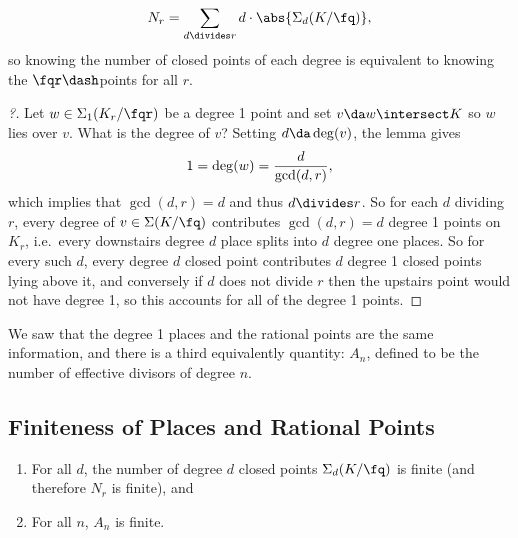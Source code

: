 \begin{corollary}

\begin{align*}  
N_r = \sum_{d\divides r} d\cdot \abs{\Sigma_d(K/ \fq)}
,\end{align*} so knowing the number of closed points of each degree is
equivalent to knowing the \(\fqr\dash\)points for all \(r\).

\end{corollary}

\begin{proof}[?]

Let \(w\in \Sigma_1(K_r/\fqr)\) be a degree 1 point and set
\(v \da w\intersect K\) so \(w\) lies over \(v\). What is the degree of
\(v\)? Setting \(d \da \deg(v)\), the lemma gives
\begin{align*}  
1 = \deg(w) = {d\over \gcd(d, r)}
,\end{align*} which implies that \(\gcd(d, r) = d\) and thus
\(d\divides r\). So for each \(d\) dividing \(r\), every degree of
\(v\in \Sigma(K/\fq)\) contributes \(\gcd(d, r) = d\) degree 1 points on
\(K_r\), i.e.~every downstairs degree \(d\) place splits into \(d\)
degree one places. So for every such \(d\), every degree \(d\) closed
point contributes \(d\) degree 1 closed points lying above it, and
conversely if \(d\) does not divide \(r\) then the upstairs point would
not have degree 1, so this accounts for all of the degree 1 points.

\end{proof}

\begin{remark}

We saw that the degree 1 places and the rational points are the same
information, and there is a third equivalently quantity: \(A_n\),
defined to be the number of effective divisors of degree \(n\).

\end{remark}

\hypertarget{finiteness-of-places-and-rational-points}{%
\subsection{Finiteness of Places and Rational
Points}\label{finiteness-of-places-and-rational-points}}

\begin{lemma}[?]

\envlist

\begin{enumerate}
\def\labelenumi{\alph{enumi}.}
\item
  For all \(d\), the number of degree \(d\) closed points
  \(\Sigma_d(K/\fq)\) is finite (and therefore \(N_r\) is finite), and
\item
  For all \(n\), \(A_n\) is finite.
\end{enumerate}

\end{lemma}

